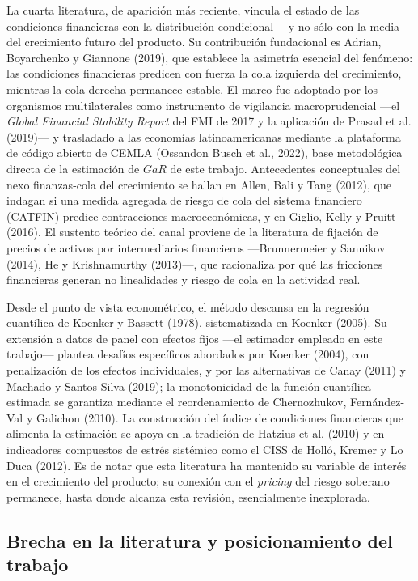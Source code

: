 \documentclass[5p,times,twocolumn,authoryear]{elsarticle}
\begin{document}
La cuarta literatura, de aparición más reciente, vincula el estado de las condiciones financieras con la distribución condicional —y no sólo con la media— del crecimiento futuro del producto. Su contribución fundacional es Adrian, Boyarchenko y Giannone (2019), que establece la asimetría esencial del fenómeno: las condiciones financieras predicen con fuerza la cola izquierda del crecimiento, mientras la cola derecha permanece estable. El marco fue adoptado por los organismos multilaterales como instrumento de vigilancia macroprudencial —el \textit{Global Financial Stability Report} del FMI de 2017 y la aplicación de Prasad et al. (2019)— y trasladado a las economías latinoamericanas mediante la plataforma de código abierto de CEMLA (Ossandon Busch et al., 2022), base metodológica directa de la estimación de $GaR$ de este trabajo. Antecedentes conceptuales del nexo finanzas-cola del crecimiento se hallan en Allen, Bali y Tang (2012), que indagan si una medida agregada de riesgo de cola del sistema financiero (CATFIN) predice contracciones macroeconómicas, y en Giglio, Kelly y Pruitt (2016). El sustento teórico del canal proviene de la literatura de fijación de precios de activos por intermediarios financieros —Brunnermeier y Sannikov (2014), He y Krishnamurthy (2013)—, que racionaliza por qué las fricciones financieras generan no linealidades y riesgo de cola en la actividad real.

Desde el punto de vista econométrico, el método descansa en la regresión cuantílica de Koenker y Bassett (1978), sistematizada en Koenker (2005). Su extensión a datos de panel con efectos fijos —el estimador empleado en este trabajo— plantea desafíos específicos abordados por Koenker (2004), con penalización de los efectos individuales, y por las alternativas de Canay (2011) y Machado y Santos Silva (2019); la monotonicidad de la función cuantílica estimada se garantiza mediante el reordenamiento de Chernozhukov, Fernández-Val y Galichon (2010). La construcción del índice de condiciones financieras que alimenta la estimación se apoya en la tradición de Hatzius et al. (2010) y en indicadores compuestos de estrés sistémico como el CISS de Holló, Kremer y Lo Duca (2012). Es de notar que esta literatura ha mantenido su variable de interés en el crecimiento del producto; su conexión con el \textit{pricing} del riesgo soberano permanece, hasta donde alcanza esta revisión, esencialmente inexplorada.

\subsection{Brecha en la literatura y posicionamiento del trabajo}
\end{document}
